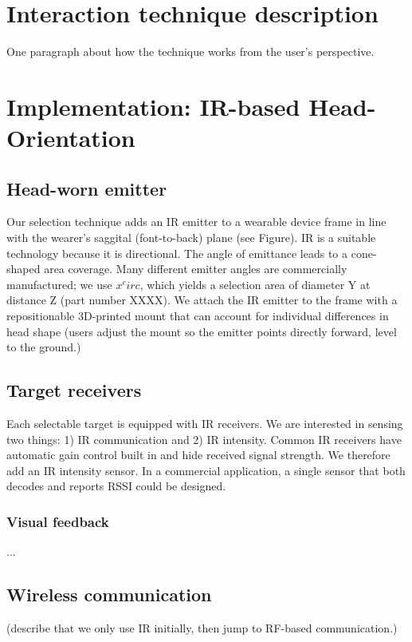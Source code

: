 

\section{Interaction technique description}
One paragraph about how the technique works from the user's perspective.
\section{Implementation: IR-based Head-Orientation}
\subsection{Head-worn emitter}
Our selection technique adds an IR emitter to a wearable device frame in line with the wearer's saggital (font-to-back) plane (see Figure). IR is a suitable technology because it is directional. The angle of emittance leads to a cone-shaped area coverage. Many different emitter angles are commercially manufactured; we use $x^circ$, which yields a selection area of diameter Y at distance Z (part number XXXX).
We attach the IR emitter to the frame with a repositionable 3D-printed mount that can account for individual differences in head shape (users adjust the mount so the emitter points directly forward, level to the ground.)

\subsection{Target receivers}
Each selectable target is equipped with IR receivers. We are interested in sensing two things: 1) IR communication and 2) IR intensity. Common IR receivers have automatic gain control built in and hide received signal strength. We therefore add an IR intensity sensor. In a commercial application, a single sensor that both decodes and reports RSSI could be designed.
\subsubsection{Visual feedback}
...
\subsection{Wireless communication}
(describe that we only use IR initially, then jump to RF-based communication.)

